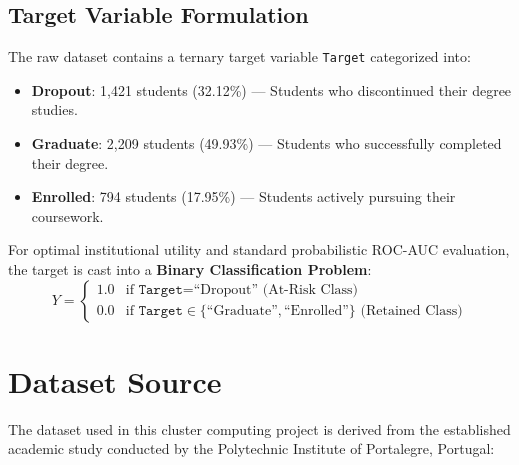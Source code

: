 \documentclass[11pt,a4paper]{article}
\begin{document}
\subsection{Target Variable Formulation}
The raw dataset contains a ternary target variable \texttt{Target} categorized into:
\begin{itemize}
    \item \textbf{Dropout}: 1,421 students (32.12\%) --- Students who discontinued their degree studies.
    \item \textbf{Graduate}: 2,209 students (49.93\%) --- Students who successfully completed their degree.
    \item \textbf{Enrolled}: 794 students (17.95\%) --- Students actively pursuing their coursework.
\end{itemize}

For optimal institutional utility and standard probabilistic ROC-AUC evaluation, the target is cast into a \textbf{Binary Classification Problem}:
\begin{equation}
    Y = \begin{cases}
        1.0 & \text{if } \texttt{Target} = \text{``Dropout'' (At-Risk Class)} \\
        0.0 & \text{if } \texttt{Target} \in \{\text{``Graduate''}, \text{``Enrolled''}\} \text{ (Retained Class)}
    \end{cases}
\end{equation}

\section{Dataset Source}
\label{sec:dataset_source}

The dataset used in this cluster computing project is derived from the established academic study conducted by the Polytechnic Institute of Portalegre, Portugal:
\end{document}
